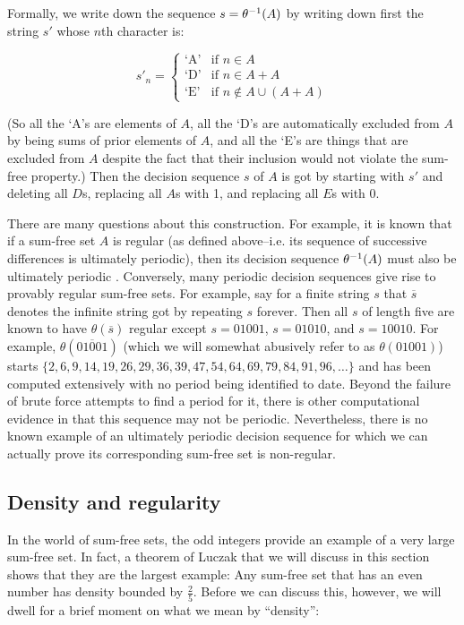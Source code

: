 \documentclass{report}
\theoremstyle{remark}
\numberwithin{equation}{section}
\begin{document}
Formally, we write down the sequence $s = \theta^{-1}(A)$ by writing
down first the string $s'$ whose $n$th character is: 

\[s'_n = \begin{cases}
\text{`A'}& \text{if } n \in A\\
\text{`D'}& \text{if } n \in A+A\\
\text{`E'}& \text{if } n \notin A \cup (A+A)
\end{cases}\]

(So all the `A's are elements of $A$, all the `D's are automatically
excluded from $A$ by being sums of prior elements of $A$, and all the
`E's are things that are excluded from $A$ despite the fact that their
inclusion would not violate the sum-free property.)  Then the decision
sequence $s$ of $A$ is got by starting with $s'$ and deleting all
$D$s, replacing all $A$s with 1, and replacing all $E$s with 0.

There are many questions about this construction.  For example, it is
known that if a sum-free set $A$ is regular (as defined
above--i.e. its sequence of successive differences is ultimately
periodic), then its decision sequence $\theta^{-1}(A)$ must also be
ultimately periodic \cite{cameron:sc1987}.  Conversely, many periodic
decision sequences give rise to provably regular sum-free sets.  For
example, say for a finite string $s$ that $\overline{s}$ denotes the
infinite string got by repeating $s$ forever.  Then all $s$ of length
five are known to have $\theta(\overline{s})$ regular except
$s = 01001$, $s = 01010$, and $s = 10010$.  For example,
$\theta(\overline{01001})$ (which we will somewhat abusively refer to
as $\theta(01001)$) starts
$\{2, 6, 9, 14, 19, 26, 29, 36, 39, 47, 54, 64, 69, 79, 84, 91, 96,
\ldots\}$ and has been computed extensively with no period being
identified to date.  Beyond the failure of brute force attempts to
find a period for it, there is other computational evidence in
\cite{calkin:int2005} that this sequence may not be periodic.
Nevertheless, there is no known example of an ultimately periodic
decision sequence for which we can actually prove its corresponding
sum-free set is non-regular.

\subsection{Density and regularity}

In the world of sum-free sets, the odd integers provide an example of
a very large sum-free set.  In fact, a theorem of Luczak that we will
discuss in this section shows that they are the largest example: Any
sum-free set that has an even number has density bounded by $\frac25$.
Before we can discuss this, however, we will dwell for a brief moment
on what we mean by ``density'':
\end{document}
